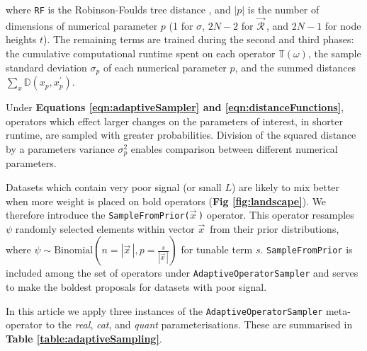 \documentclass[10pt,letterpaper]{article}
\begin{document}
\noindent
where \texttt{RF} is the Robinson-Foulds tree distance \cite{robinson1981comparison}, and $|p|$ is the number of dimensions of numerical parameter $p$ (1 for $\sigma$, $2N-2$ for $\vec{\mathcal{R}}^{\,}$, and $2N-1$ for node heights $t$).
The remaining terms are trained during the second and third phases: the cumulative computational runtime spent on each operator $\mathbb{T}(\omega)$, the sample standard deviation $\sigma_p$ of each numerical parameter $p$, and the summed distances $\sum_x \mathbb{D}(x_p, x_p^\prime)$.








Under \textbf{Equations \ref{eqn:adaptiveSampler} and \ref{eqn:distanceFunctions}}, operators which effect larger changes on the parameters of interest, in shorter runtime, are sampled with greater probabilities. 
Division of the squared distance by a parameters variance $\sigma^2_p$ enables comparison between different numerical parameters.


Datasets which contain very poor signal (or small $L$) are likely to mix better when more weight is placed on bold operators (\textbf{Fig \ref{fig:landscape}}). 
We therefore introduce the \texttt{SampleFromPrior($\vec{x}^{\,}$)} operator.
This operator resamples $\psi$ randomly selected elements within vector $\vec{x}^{\,}$ from their prior distributions, where $\psi \sim \text{Binomial}(n=|\vec{x}^{\,}|, p=\frac{s}{|\vec{x}^{\,}|})$ for tunable term $s$.
\texttt{SampleFromPrior} is included among the set of operators under \texttt{AdaptiveOperatorSampler} and serves to make the boldest proposals for datasets with poor signal.
 






In this article we apply three instances of the \texttt{AdaptiveOperatorSampler} meta-operator to the \textit{real}, \textit{cat}, and \textit{quant} parameterisations. 
These are summarised in \textbf{Table \ref{table:adaptiveSampling}}.
\end{document}
